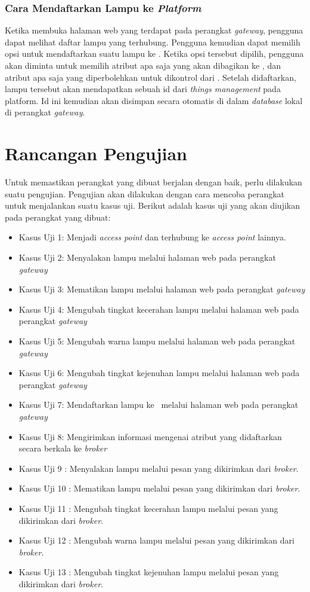 \subsubsection{Cara Mendaftarkan Lampu ke \textit{Platform}}
Ketika membuka halaman web yang terdapat pada perangkat \textit{gateway}, pengguna dapat melihat daftar lampu yang terhubung. Pengguna kemudian dapat memilih opsi untuk mendaftarkan suatu lampu ke \plat. Ketika opsi tersebut dipilih, pengguna akan diminta untuk memilih atribut apa saja yang akan dibagikan ke \plat, dan atribut apa saja yang diperbolehkan untuk dikontrol dari \plat. Setelah didaftarkan, lampu tersebut akan mendapatkan sebuah id dari \textit{things management} pada platform. Id ini kemudian akan disimpan secara otomatis di dalam \textit{database} lokal di perangkat \textit{gateway}.

\section{Rancangan Pengujian}

Untuk memastikan perangkat yang dibuat berjalan dengan baik, perlu dilakukan suatu pengujian. Pengujian akan dilakukan dengan cara mencoba perangkat untuk menjalankan suatu kasus uji. Berikut adalah kasus uji yang akan diujikan pada perangkat yang dibuat:

\begin{itemize}
	\item Kasus Uji 1: Menjadi \textit{access point} dan terhubung ke \textit{access point} lainnya.
	\item Kasus Uji 2: Menyalakan lampu melalui halaman web pada perangkat \textit{gateway}
	\item Kasus Uji 3: Mematikan lampu melalui halaman web pada perangkat \textit{gateway}
	\item Kasus Uji 4: Mengubah tingkat kecerahan lampu melalui halaman web pada perangkat \textit{gateway}
	\item Kasus Uji 5: Mengubah warna lampu melalui halaman web pada perangkat \textit{gateway}
	\item Kasus Uji 6: Mengubah tingkat kejenuhan lampu melalui halaman web pada perangkat \textit{gateway}
	\item Kasus Uji 7: Mendaftarkan lampu ke \plat~melalui halaman web pada perangkat \textit{gateway}
	\item Kasus Uji 8: Mengirimkan informasi mengenai atribut yang didaftarkan secara berkala ke \textit{broker}
	\item Kasus Uji 9 : Menyalakan lampu melalui pesan yang dikirimkan dari \textit{broker}.
	\item Kasus Uji 10 : Mematikan lampu melalui pesan yang dikirimkan dari \textit{broker}.
	\item Kasus Uji 11 : Mengubah tingkat kecerahan lampu melalui pesan yang dikirimkan dari \textit{broker}.
	\item Kasus Uji 12 : Mengubah warna lampu melalui pesan yang dikirimkan dari \textit{broker}.
	\item Kasus Uji 13 : Mengubah tingkat kejenuhan lampu melalui pesan yang dikirimkan dari \textit{broker}.
	
\end{itemize}

